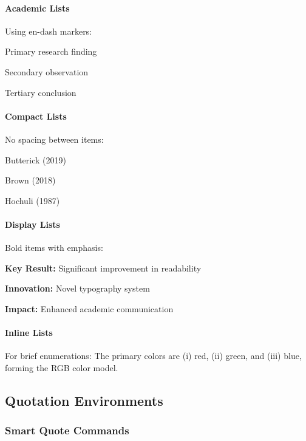 \paragraph{Academic Lists} Using en-dash markers:
\begin{academicitem}
\item Primary research finding
\item Secondary observation
\item Tertiary conclusion
\end{academicitem}

\paragraph{Compact Lists} No spacing between items:
\begin{compactitem}
\item Butterick (2019)
\item Brown (2018)
\item Hochuli (1987)
\end{compactitem}

\paragraph{Display Lists} Bold items with emphasis:
\begin{displayitem}
\item \textbf{Key Result:} Significant improvement in readability
\item \textbf{Innovation:} Novel typography system
\item \textbf{Impact:} Enhanced academic communication
\end{displayitem}

\paragraph{Inline Lists} For brief enumerations:
The primary colors are (i) red, (ii) green, and (iii) blue, forming the RGB color model.

\subsection{Quotation Environments}

\subsubsection{Smart Quote Commands}

